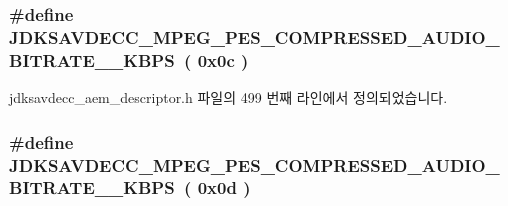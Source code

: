\subsubsection[{\texorpdfstring{J\+D\+K\+S\+A\+V\+D\+E\+C\+C\+\_\+\+M\+P\+E\+G\+\_\+\+P\+E\+S\+\_\+\+C\+O\+M\+P\+R\+E\+S\+S\+E\+D\+\_\+\+A\+U\+D\+I\+O\+\_\+\+B\+I\+T\+R\+A\+T\+E\+\_\+144\+\_\+\+K\+B\+PS}{JDKSAVDECC_MPEG_PES_COMPRESSED_AUDIO_BITRATE_144_KBPS}}]{\setlength{\rightskip}{0pt plus 5cm}\#define J\+D\+K\+S\+A\+V\+D\+E\+C\+C\+\_\+\+M\+P\+E\+G\+\_\+\+P\+E\+S\+\_\+\+C\+O\+M\+P\+R\+E\+S\+S\+E\+D\+\_\+\+A\+U\+D\+I\+O\+\_\+\+B\+I\+T\+R\+A\+T\+E\+\_\+\_\+\+K\+B\+PS~( 0x0c )}\hypertarget{group__mpeg__pes__compressed__audio__bitrate_ga2eafc3f2a60b46695c458e8b12a46cf6}{}\label{group__mpeg__pes__compressed__audio__bitrate_ga2eafc3f2a60b46695c458e8b12a46cf6}


jdksavdecc\+\_\+aem\+\_\+descriptor.\+h 파일의 499 번째 라인에서 정의되었습니다.

\subsubsection[{\texorpdfstring{J\+D\+K\+S\+A\+V\+D\+E\+C\+C\+\_\+\+M\+P\+E\+G\+\_\+\+P\+E\+S\+\_\+\+C\+O\+M\+P\+R\+E\+S\+S\+E\+D\+\_\+\+A\+U\+D\+I\+O\+\_\+\+B\+I\+T\+R\+A\+T\+E\+\_\+160\+\_\+\+K\+B\+PS}{JDKSAVDECC_MPEG_PES_COMPRESSED_AUDIO_BITRATE_160_KBPS}}]{\setlength{\rightskip}{0pt plus 5cm}\#define J\+D\+K\+S\+A\+V\+D\+E\+C\+C\+\_\+\+M\+P\+E\+G\+\_\+\+P\+E\+S\+\_\+\+C\+O\+M\+P\+R\+E\+S\+S\+E\+D\+\_\+\+A\+U\+D\+I\+O\+\_\+\+B\+I\+T\+R\+A\+T\+E\+\_\+\_\+\+K\+B\+PS~( 0x0d )}\hypertarget{group__mpeg__pes__compressed__audio__bitrate_gaecba814c47cbd4df7e5c3906b1cd7d2a}{}\label{group__mpeg__pes__compressed__audio__bitrate_gaecba814c47cbd4df7e5c3906b1cd7d2a}


